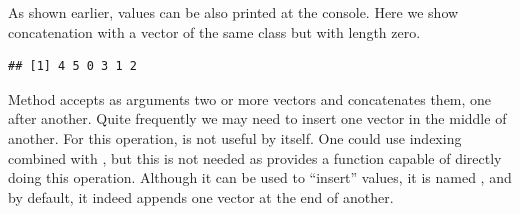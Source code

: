 \documentclass[krantz2]{krantz}\usepackage{knitr}
\begin{document}
\begin{center}
\begin{small}
\end{small}
\end{center}

As shown earlier, values can be also printed at the \Rlang console. Here we show concatenation with a vector of the same class but with length zero.

\begin{knitrout}\footnotesize
{}\color{fgcolor}\begin{kframe}
\begin{alltt}
 \hlstd{())}
\end{alltt}
\begin{verbatim}
## [1] 4 5 0 3 1 2
\end{verbatim}
\end{kframe}
\end{knitrout}

Method  accepts as arguments two or more vectors and concatenates them, one after another. Quite frequently we may need to insert one vector in the middle of another. For this operation,  is not useful by itself. One could use indexing combined with , but this is not needed as \Rlang provides a function capable of directly doing this operation. Although it can be used to ``insert'' values, it is named , and by default, it indeed appends one vector at the end of another.
\end{document}
